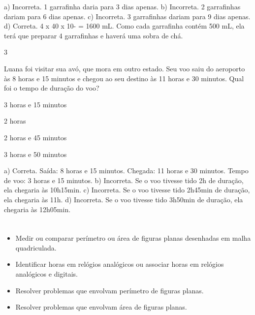 \begin{escolha}
a) Incorreta. 1 garrafinha daria para 3 dias apenas.
b) Incorreta. 2 garrafinhas dariam para 6 dias apenas.
c) Incorreta. 3 garrafinhas dariam para 9 dias apenas.
d) Correta. 4 x 40 x 10- = 1600 mL. Como cada garrafinha contém 500 mL, ela terá que
preparar 4 garrafinhas e haverá uma sobra de chá.

\num{3}

Luana foi visitar sua avó, que mora em outro estado. Seu voo
saiu do aeroporto às 8 horas e 15 minutos e chegou ao seu destino às 11
horas e 30 minutos. Qual foi o tempo de duração do voo?

\begin{escolha}

\item
  3 horas e 15 minutos
\item
  2 horas 
\item
  2 horas e 45 minutos
\item
  3 horas e 50 minutos
\end{escolha}

a) Correta. Saída: 8 horas e 15 minutos. Chegada: 11 horas e 30 minutos. Tempo de voo: 3 horas e 15 minutos.
b) Incorreta. Se o voo tivesse tido 2h de duração, ela chegaria às 10h15min.
c) Incorreta. Se o voo tivesse tido 2h45min de duração, ela chegaria às 11h.
d) Incorreta. Se o voo tivesse tido 3h50min de duração, ela chegaria às 12h05min.


\chapter{}


\begin{itemize}
    \item Medir ou comparar perímetro ou área de figuras planas desenhadas em
malha quadriculada.

    \item Identificar horas em relógios analógicos ou associar horas em relógios
analógicos e digitais.

    \item Resolver problemas que envolvam perímetro de figuras planas.

    \item Resolver problemas que envolvam área de figuras planas.
\end{itemize}



\end{escolha}
